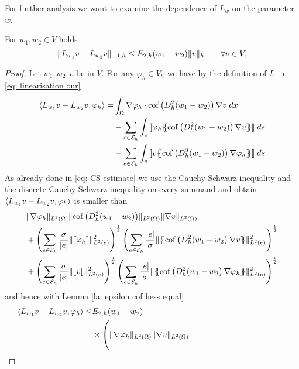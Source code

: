 For further analysis we want to examine the dependence of $L_w$ on the parameter $w$.
\begin{lemma}\label{la: L dependence paramter}
	For $w_1, w_2 \in V$ holds
	\[
		\lVert L_{w_1} v - L_{w_2} v \rVert_{-1,h} \leq E_{2,h}(w_1 - w_2) \lVert v \rVert_{h} \qquad \forall v \in V,
	\]
\end{lemma}
\begin{proof}
	Let $w_1, w_2, v$ be in $V$. For any $\varphi_h \in V_h$ we have by the definition of $L$ in \eqref{eq: linearisation our}
	\begin{align}
		\bilin{L_{w_1}v- L_{w_2} v} {\varphi_h} =  
			&\myIntX  \Omega { \nabla \varphi_h \cdot \cofHessH{(w_1-w_2)} \nabla v}  \nonumber\\
			& -\sum\limits_{e \in \edges}\myIntS e { \jump {\varphi_h \average { \cofHessH{(w_1-w_2)} \nabla v} }} \nonumber \\
			& - \sum\limits_{e \in \edges}\myIntS e { \jump {v \average{ \cofHessH{(w_1-w_2)} \nabla \varphi_h} }} \label{eq: diff linear}
	\end{align}
	As already done in \eqref{eq: CS estimate} we use the Cauchy-Schwarz inequality and the discrete Cauchy-Schwarz inequality on every summand and obtain $ \langle L_{w_1}v- L_{w_2} v, \varphi_h \rangle$ is smaller than
	\begin{align*}
		& \LTwonorm{\nabla \varphi_h} \LTwonorm{\cofHessH{(w_1 -w_2)}} \LTwonorm {\nabla v} \nonumber \\
			&+ \left( \sum_{e \in \edges} \frac {\sigma}{|e|}\LTwonormE{\jump {\varphi_h}}^2 \right)^{\frac 1 2}
			   \left( \sum_{e \in \edges} \frac {|e|} \sigma\LTwonormE{\average{\cofHessH{(w_1-w_2} \nabla v}}^2 \right)^{\frac 1 2} \\
			&+ \left( \sum_{e \in \edges} \frac {\sigma}{|e|}\LTwonormE{\jump v}^2 \right)^{\frac 1 2}
			\left( \sum_{e \in \edges} \frac {|e|} \sigma\LTwonormE{\average{\cofHessH{(w_1-w_2} \nabla \varphi_h}}^2 \right)^{\frac 1 2}
	\end{align*}
	and hence with Lemma \ref{la: epsilon cof hess equal}
	\begin{align*}
		\bilin{L_{w_1}v- L_{w_2} v} {\varphi_h}
		\leq& \epsilonTwo{w_1 - w_2} \\
			&\times 
			\left( \LTwonorm{\nabla \varphi_h} \LTwonorm {\nabla v} 
				\phantom{\left( \sum_{e \in \edges} \frac {|e|} \sigma\LTwonormE{\average{\nabla \varphi_h}}^2 \right)^{\frac 1 2}}
			 \right.\nonumber \\

\end{align*}
\end{proof}
